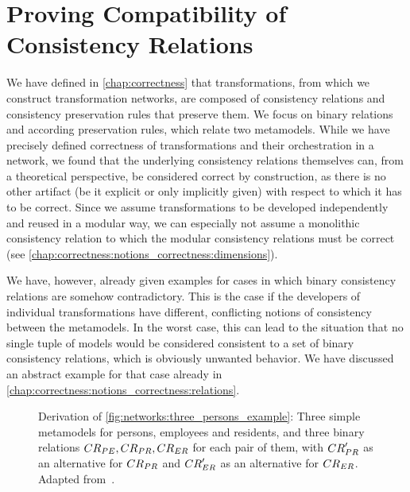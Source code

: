 \chapter{Proving Compatibility of Consistency Relations
}
\label{chap:compatibility}

We have defined in \autoref{chap:correctness} that transformations, from which we construct transformation networks, are composed of consistency relations and consistency preservation rules that preserve them.
We focus on binary relations and according preservation rules, which relate two metamodels.
While we have precisely defined correctness of transformations and their orchestration in a network, we found that the underlying consistency relations themselves can, from a theoretical perspective, be considered correct by construction, as there is no other artifact (be it explicit or only implicitly given) with respect to which it has to be correct.
Since we assume transformations to be developed independently and reused in a modular way, we can especially not assume a monolithic consistency relation to which the modular consistency relations must be correct (see \autoref{chap:correctness:notions_correctness:dimensions}).

We have, however, already given examples for cases in which binary consistency relations are somehow contradictory.
This is the case if the developers of individual transformations have different, conflicting notions of consistency between the metamodels.
In the worst case, this can lead to the situation that no single tuple of models would be considered consistent to a set of binary consistency relations, which is obviously unwanted behavior.
We have discussed an abstract example for that case already in \autoref{chap:correctness:notions_correctness:relations}.

\begin{figure}
    \centering
    
    \caption[Three metamodels with (in-)compatible consistency relations]{Derivation of \autoref{fig:networks:three_persons_example}: Three simple metamodels for persons, employees and residents, and three binary relations $\consistencyrelation{CR}{PE}, \consistencyrelation{CR}{PR}, \consistencyrelation{CR}{ER}$ for each pair of them, with $\consistencyrelation{CR}{PR}'$ as an alternative for $\consistencyrelation{CR}{PR}$ and $\consistencyrelation{CR}{ER}'$ as an alternative for $\consistencyrelation{CR}{ER}$. Adapted from~.}
    \label{fig:compatibility:three_persons_example_extended}
\end{figure}

